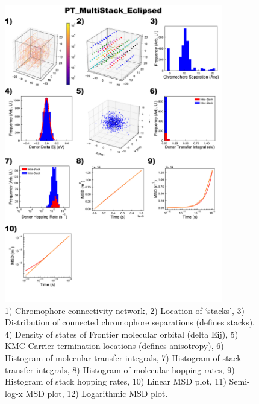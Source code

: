 \documentclass[12pt]{article}
\begin{document}
\begin{figure}[h]\centering
	\includegraphics[width=0.85\textwidth]{Figures/PT_MultiStack_Eclipsed.png}
    \caption{   1) Chromophore connectivity network, 
                2) Location of `stacks', 
                3) Distribution of connected chromophore separations (defines stacks),
                4) Density of states of Frontier molecular orbital (delta Eij),
                5) KMC Carrier termination locations (defines anisotropy),
                6) Histogram of molecular transfer integrals,
                7) Histogram of stack transfer integrals,
                8) Histogram of molecular hopping rates,
                9) Histogram of stack hopping rates,
                10) Linear MSD plot,
                11) Semi-log-x MSD plot,
                12) Logarithmic MSD plot.}
	\label{fig:PTMultEcl}
\end{figure}
\end{document}
